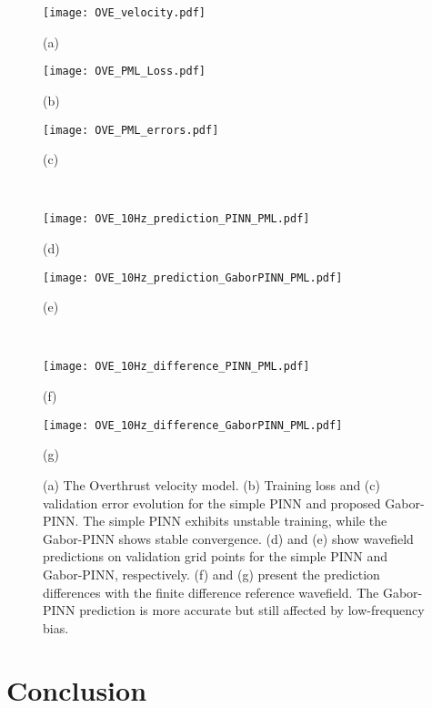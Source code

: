 \documentclass[authoryear, preprint, 12pt]{elsarticle}
\begin{document}
	
	
	\begin{figure}[htbp]
		\centering
		\begin{minipage}{0.48\textwidth}
			\centering
			\texttt{[image: OVE\_velocity.pdf]}
			\caption*{(a)}
		\end{minipage}
		\begin{minipage}{0.25\textwidth}
			\centering
			\texttt{[image: OVE\_PML\_Loss.pdf]}
			\caption*{(b)}
		\end{minipage}
				\begin{minipage}{0.25\textwidth}
			\centering
			\texttt{[image: OVE\_PML\_errors.pdf]}
			\caption*{(c)}
		\end{minipage}
		\\
		\begin{minipage}{0.48\textwidth}
			\centering
			\texttt{[image: OVE\_10Hz\_prediction\_PINN\_PML.pdf]}
			\caption*{(d)}
		\end{minipage}
		\begin{minipage}{0.48\textwidth}
			\centering
			\texttt{[image: OVE\_10Hz\_prediction\_GaborPINN\_PML.pdf]}
			\caption*{(e)}
		\end{minipage}
				\\
		\begin{minipage}{0.49\textwidth}
			\centering
			\texttt{[image: OVE\_10Hz\_difference\_PINN\_PML.pdf]}
			\caption*{(f)}
		\end{minipage}
		\begin{minipage}{0.49\textwidth}
			\centering
			\texttt{[image: OVE\_10Hz\_difference\_GaborPINN\_PML.pdf]}
			\caption*{(g)}
		\end{minipage}
		\caption{(a) The Overthrust velocity model. (b) Training loss and (c) validation error evolution for the simple PINN and proposed Gabor-PINN. The simple PINN exhibits unstable training, while the Gabor-PINN shows stable convergence. (d) and (e) show wavefield predictions on validation grid points for the simple PINN and Gabor-PINN, respectively. (f) and (g) present the prediction differences with the finite difference reference wavefield. The Gabor-PINN prediction is more accurate but still affected by low-frequency bias.}
		\label{fig:test3_OVE_results}
	\end{figure}


\section*{Conclusion}
\end{document}
